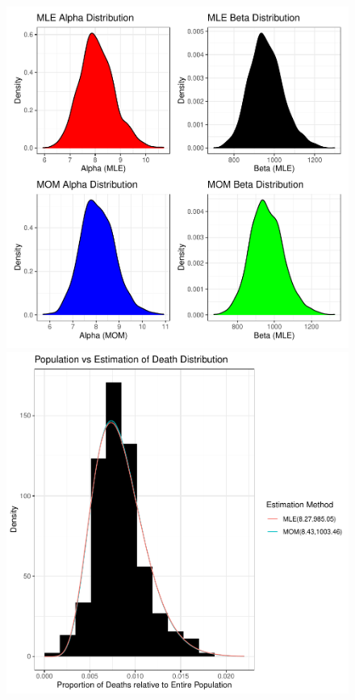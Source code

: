 \documentclass{article}\usepackage[]{graphicx}\usepackage[]{xcolor}
\begin{document}
   \begin{figure}[H]
    \begin{center}
       \includegraphics[scale=0.5]{mle&mom.pdf}
       \includegraphics[scale=0.5]{PopvEst.pdf}
       \caption{}
     \label{densityf}
     \end{center}
   \end{figure}
\end{document}
